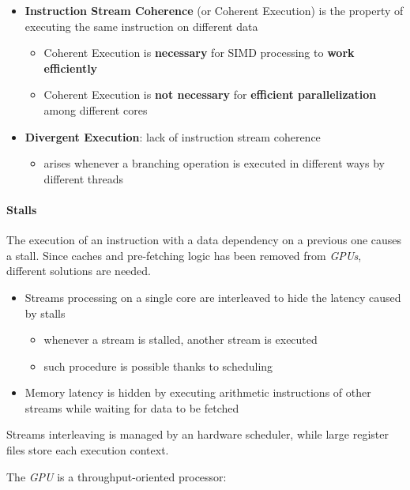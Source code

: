 \documentclass[english]{article}
\begin{document}
\begin{itemize}
  \item \textbf{Instruction Stream Coherence} (or Coherent Execution) is the property of executing the same instruction on different data
        \begin{itemize}
          \item Coherent Execution is \textbf{necessary} for SIMD processing to \textbf{work efficiently}
          \item Coherent Execution is \textbf{not necessary} for \textbf{efficient parallelization} among different cores
        \end{itemize}
  \item \textbf{Divergent Execution}: lack of instruction stream coherence
        \begin{itemize}
          \item arises whenever a branching operation is executed in different ways by different threads
        \end{itemize}
\end{itemize}

\paragraph{Stalls}

The execution of an instruction with a data dependency on a previous one causes a stall.
Since caches and pre-fetching logic has been removed from \textit{GPUs}, different solutions are needed.

\begin{itemize}
  \item Streams processing on a single core are interleaved to hide the latency caused by stalls
        \begin{itemize}
          \item whenever a stream is stalled, another stream is executed
          \item such procedure is possible thanks to scheduling
        \end{itemize}
  \item Memory latency is hidden by executing arithmetic instructions of other streams while waiting for data to be fetched
\end{itemize}

Streams interleaving is managed by an hardware scheduler, while large register files store each execution context.

\bigskip
The \textit{GPU} is a throughput-oriented processor:
\end{document}
